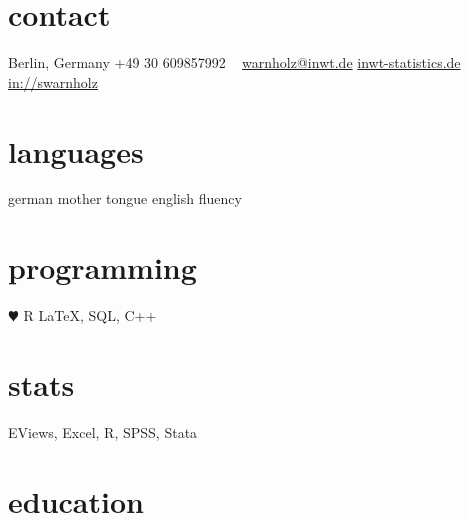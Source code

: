 \documentclass[]{friggeri-cv} %
\begin{document}


\begin{aside} %
\section{contact}
Berlin, Germany
+49 30 609857992
~
\href{mailto:sebastian.warnholz@inwt-statistics.de}{warnholz@inwt.de}
\href{https://www.inwt-statistics.de/}{inwt-statistics.de}
\href{https://www.linkedin.com/in/sebastianwarnholz/}{in://swarnholz}
\section{languages}
german mother tongue
english fluency
\section{programming}
{\color{red} $\varheartsuit$} R
\LaTeX, SQL, C++
\section{stats}
EViews, Excel, R, 
SPSS, Stata
\end{aside}


\section{education}
\end{document}
